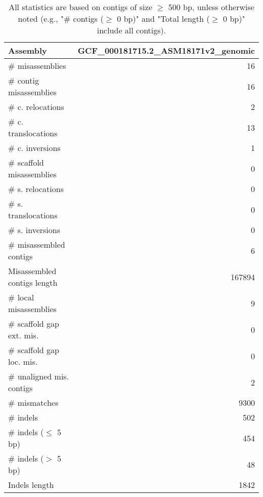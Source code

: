 \documentclass[12pt,a4paper]{article}
\begin{document}
\begin{table}[ht]
\begin{center}
\caption{All statistics are based on contigs of size $\geq$ 500 bp, unless otherwise noted (e.g., "\# contigs ($\geq$ 0 bp)" and "Total length ($\geq$ 0 bp)" include all contigs).}
\begin{tabular}{|l*{1}{|r}|}
\hline
Assembly & GCF\_000181715.2\_ASM18171v2\_genomic \\ \hline
\# misassemblies & 16 \\ \hline
\hspace{2mm}\# contig misassemblies & 16 \\ \hline
\hspace{5mm}\# c. relocations & 2 \\ \hline
\hspace{5mm}\# c. translocations & 13 \\ \hline
\hspace{5mm}\# c. inversions & 1 \\ \hline
\hspace{2mm}\# scaffold misassemblies & 0 \\ \hline
\hspace{5mm}\# s. relocations & 0 \\ \hline
\hspace{5mm}\# s. translocations & 0 \\ \hline
\hspace{5mm}\# s. inversions & 0 \\ \hline
\# misassembled contigs & 6 \\ \hline
Misassembled contigs length & 167894 \\ \hline
\# local misassemblies & 9 \\ \hline
\# scaffold gap ext. mis. & 0 \\ \hline
\# scaffold gap loc. mis. & 0 \\ \hline
\# unaligned mis. contigs & 2 \\ \hline
\# mismatches & 9300 \\ \hline
\# indels & 502 \\ \hline
\hspace{5mm}\# indels ($\leq$ 5 bp) & 454 \\ \hline
\hspace{5mm}\# indels ($>$ 5 bp) & 48 \\ \hline
Indels length & 1842 \\ \hline
\end{tabular}
\end{center}
\end{table}
\end{document}
